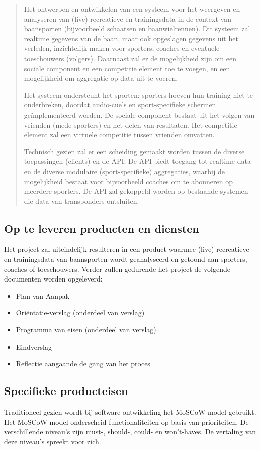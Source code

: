 \begin{quotation}
Het ontwerpen en ontwikkelen van een systeem voor het weergeven en analyseren van (live) recreatieve en trainingsdata in de context van baansporten (bijvoorbeeld schaatsen en baanwielrennen). Dit systeem zal realtime gegevens van de baan, maar ook opgeslagen gegevens uit het verleden, inzichtelijk maken voor sporters, coaches en eventuele toeschouwers (volgers). Daarnaast zal er de mogelijkheid zijn om een sociale component en een competitie element toe te voegen, en een mogelijkheid om aggregatie op data uit te voeren.

Het systeem ondersteunt het sporten: sporters hoeven hun training niet te onderbreken, doordat audio-cue's en sport-specifieke schermen geïmplementeerd worden. De sociale component bestaat uit het volgen van vrienden (mede-sporters) en het delen van resultaten. Het competitie element zal een virtuele competitie tussen vrienden omvatten.

Technisch gezien zal er een scheiding gemaakt worden tussen de diverse toepassingen (clients) en de API. De API biedt toegang tot realtime data en de diverse modulaire (sport-specifieke) aggregaties, waarbij de mogelijkheid bestaat voor bijvoorbeeld coaches om te abonneren op meerdere sporters. De API zal gekoppeld worden op bestaande systemen die data van transponders ontsluiten.
\end{quotation}

\subsection{Op te leveren producten en diensten}
Het project zal uiteindelijk resulteren in een product waarmee (live) recreatieve- en trainingsdata van baansporten wordt geanalyseerd en getoond aan sporters, coaches of toeschouwers. Verder zullen gedurende het project de volgende documenten worden opgeleverd: \begin{itemize}
\item Plan van Aanpak
\item Oriëntatie-verslag (onderdeel van verslag)
\item Programma van eisen (onderdeel van verslag)
\item Eindverslag
\item Reflectie aangaande de gang van het proces
\end{itemize}

\subsection{Specifieke producteisen}
Traditioneel gezien wordt bij software ontwikkeling het MoSCoW model gebruikt. Het MoSCoW model onderscheid functionaliteiten op basis van prioriteiten. De verschillende niveau's zijn must-, should-, could- en won't-haves. De vertaling van deze niveau's spreekt voor zich.

